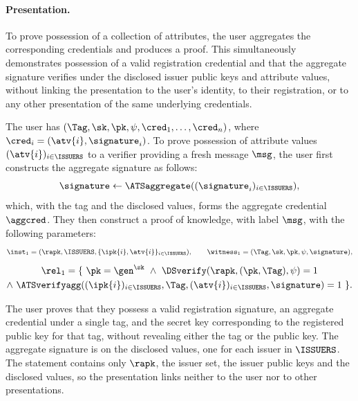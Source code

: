 \paragraph{Presentation.} To prove possession of a collection of attributes, the
user aggregates the corresponding credentials and produces a proof.  This
simultaneously demonstrates possession of a valid registration credential and
that the aggregate signature verifies under the disclosed issuer public keys and
attribute values, without linking the presentation to the user's identity, to
their registration, or to any other presentation of the same underlying
credentials.

The user has $(\Tag, \sk, \pk, \psi, \cred_1, \ldots, \cred_n)$, where $\cred_i
= (\atv{i}, \signature_i)$.  To prove possession of attribute values
$(\atv{i})_{i \in \ISSUERS}$ to a verifier providing a fresh message $\msg$, the
user first constructs the aggregate signature as follows:
%
\begin{equation*}
%
  \signature \leftarrow \ATSaggregate((\signature_i)_{i \in \ISSUERS}),
\end{equation*}
%
which, with the tag and the disclosed values, forms the aggregate credential
$\aggcred$. They then construct a proof of knowledge, with label $\msg$, with the
following parameters:
%
\begin{equation*}
%
  \inst_1 = (\rapk, \ISSUERS, \{\ipk{i}, \atv{i}\}_{i \in \ISSUERS}), \qquad
\witness_1 = (\Tag, \sk, \pk, \psi, \signature),
%
\end{equation*}
%
\begin{equation*} \begin{gathered}
%
  \rel_1 = \{\ \pk = \gen^{\sk} \ \wedge \
\DSverify(\rapk, (\pk, \Tag), \psi) = 1 \\
%
  \wedge\ \ATSverifyagg((\ipk{i})_{i \in \ISSUERS}, \Tag, (\atv{i})_{i \in
\ISSUERS}, \signature) = 1\ \}.
%
\end{gathered} \end{equation*}
%

The user proves that they possess a valid registration signature, an aggregate
credential under a single tag, and the secret key corresponding to the
registered public key for that tag, without revealing either the tag or the
public key. The aggregate signature is on the disclosed values, one for each
issuer in $\ISSUERS$. The statement contains only $\rapk$, the issuer set, the
issuer public keys and the disclosed values, so the presentation links neither
to the user nor to other presentations.

